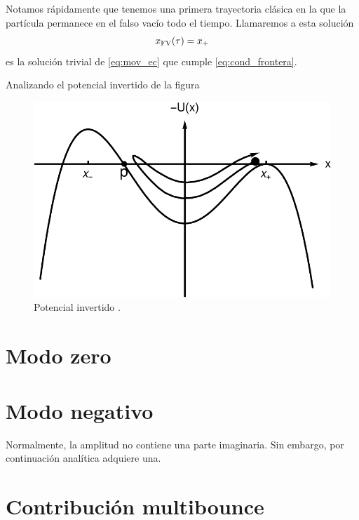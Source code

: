 Notamos rápidamente que tenemos una primera trayectoria clásica en la que la partícula permanece en el falso vacío todo el tiempo. Llamaremos a esta solución 
\begin{equation}
	x_{\text{FV}}\qty(\tau) = x_+
\end{equation}
es la solución trivial de \eqref{eq:mov_ec} que cumple  \eqref{eq:cond_frontera}.

Analizando el potencial invertido de la figura 

\begin{figure}[h]
	\centering
	\includegraphics[scale = 0.3]{FIGURAS/potencial_invertido}
	\caption{Potencial invertido \cite{Ai:2019dqr}.}
	\label{fig:potencial_invertido}
\end{figure}


\section{Modo zero}

\section{Modo negativo}

Normalmente, la amplitud no contiene una parte imaginaria. Sin embargo, por continuación analítica adquiere una. 

\section{Contribución multibounce}